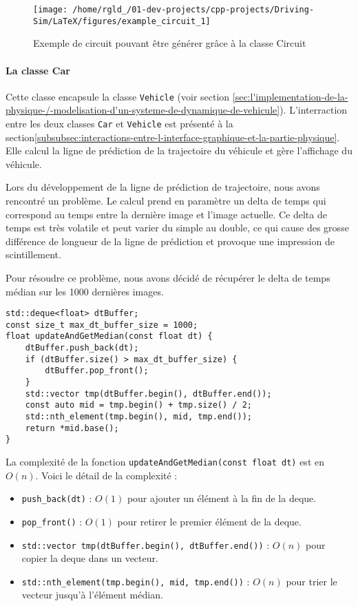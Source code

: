 \begin{figure}[h]
    \centering
    \texttt{[image: /home/rgld\_/01-dev-projects/cpp-projects/Driving-Sim/LaTeX/figures/example\_circuit\_1]} %
    \caption{Exemple de circuit pouvant être générer grâce à la classe Circuit}
    \label{fig:example_circuit_1}
\end{figure}

\paragraph[Car]{La classe \textbf{Car}}
Cette classe encapsule la classe \texttt{Vehicle} (voir section \ref{sec:l'implementation-de-la-physique-/-modelisation-d'un-systeme-de-dynamique-de-vehicule}).
L'interraction entre les deux classes \texttt{Car} et \texttt{Vehicle} est présenté à la section\ref{subsubsec:interactions-entre-l-interface-graphique-et-la-partie-physique}.
Elle calcul la ligne de prédiction de la trajectoire du véhicule et gère l'affichage du véhicule.

Lors du développement de la ligne de prédiction de trajectoire, nous avons rencontré un problème.
Le calcul prend en paramètre un delta de temps qui correspond au temps entre la dernière image et l'image actuelle.
Ce delta de temps est très volatile et peut varier du simple au double, ce qui cause des grosse différence de longueur de la ligne de prédiction et provoque une impression de scintillement.

Pour résoudre ce problème, nous avons décidé de récupérer le delta de temps médian sur les 1000 dernières images.

\begin{lstlisting}[style=CStyle, label={lst:code_dequeue_dt}]
std::deque<float> dtBuffer;
const size_t max_dt_buffer_size = 1000;
float updateAndGetMedian(const float dt) {
    dtBuffer.push_back(dt);
    if (dtBuffer.size() > max_dt_buffer_size) {
        dtBuffer.pop_front();
    }
    std::vector tmp(dtBuffer.begin(), dtBuffer.end());
    const auto mid = tmp.begin() + tmp.size() / 2;
    std::nth_element(tmp.begin(), mid, tmp.end());
    return *mid.base();
}
\end{lstlisting}

La complexité de la fonction \texttt{updateAndGetMedian(const float dt)} est en \( O(n) \).
Voici le détail de la complexité :
\begin{itemize}
    \item \texttt{push\_back(dt)} : \( O(1) \)\cite{cpp_reference_push_back} pour ajouter un élément à la fin de la deque.
    \item \texttt{pop\_front()} : \( O(1) \)\cite{cpp_reference_pop_front} pour retirer le premier élément de la deque.
    \item \texttt{std::vector tmp(dtBuffer.begin(), dtBuffer.end())} : \( O(n) \)\cite{cpp_reference_vector_copy} pour copier la deque dans un vecteur.
    \item \texttt{std::nth\_element(tmp.begin(), mid, tmp.end())} : \( O(n) \)\cite{cpp_reference_std_nth_element} pour trier le vecteur jusqu'à l'élément médian.
\end{itemize}

